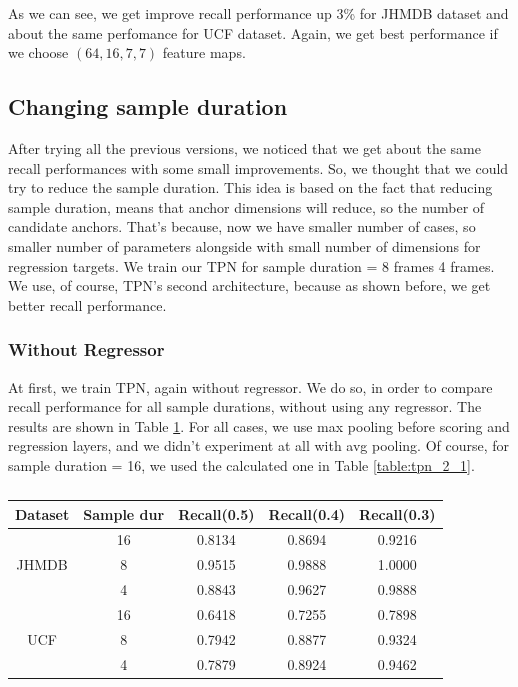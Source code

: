 As we can see, we get improve recall performance up 3\% for JHMDB dataset and about the same perfomance for UCF dataset. Again, we get best performance
if we choose $(64, 16, 7, 7)$ feature maps.

\subsection{Changing sample duration}
After trying all the previous versions, we noticed that we get about the same recall performances with some small improvements. So, we thought that we could try
to reduce the sample duration. This idea is based on the fact that reducing sample duration, means that anchor dimensions will reduce, so the number of
candidate anchors. That's because, now we have smaller number of cases, so smaller number of parameters alongside with small number of dimensions for regression targets.
We train our TPN for sample duration = 8 frames 4 frames. We use, of course, TPN's second  architecture, because as shown before, we get better recall performance.

\subsubsection{Without Regressor}

At first, we train TPN, again without regressor. We do so, in order to compare recall performance for all sample durations, without using any regressor. The results
are shown in Table \ref{table:new_sample}. For all cases, we use max pooling before scoring and regression layers, and we didn't experiment at all with
avg pooling. Of course, for sample duration = 16, we used the calculated one in  Table \ref{table:tpn_2_1}.

\begin{table}[h]
  \centering
  \begin{tabular}{|c | c || c c c|}
    \hline
    \textbf{Dataset} & \textbf{Sample dur} & \textbf{Recall(0.5)} &  \textbf{Recall(0.4)} &  \textbf{Recall(0.3)} \\
    \hline
    \multirow{3}{*}{JHMDB} & 16 & 0.8134 & 0.8694 & 0.9216 \\
    \cline{2-5}
    {} & 8 & 0.9515 & 0.9888 & 1.0000 \\
    \cline{2-5}
    {} & 4 & 0.8843 & 0.9627 & 0.9888 \\
    \hline
    \multirow{3}{*}{UCF} & 16 & 0.6418 & 0.7255 & 0.7898 \\
    \cline{2-5}
    {} & 8 & 0.7942 & 0.8877 & 0.9324\\
    \cline{2-5}
    {} & 4 & 0.7879 & 0.8924 & 0.9462 \\
    \hline
    
  \end{tabular}
  \caption{}
  \label{table:new_sample}
\end{table}

